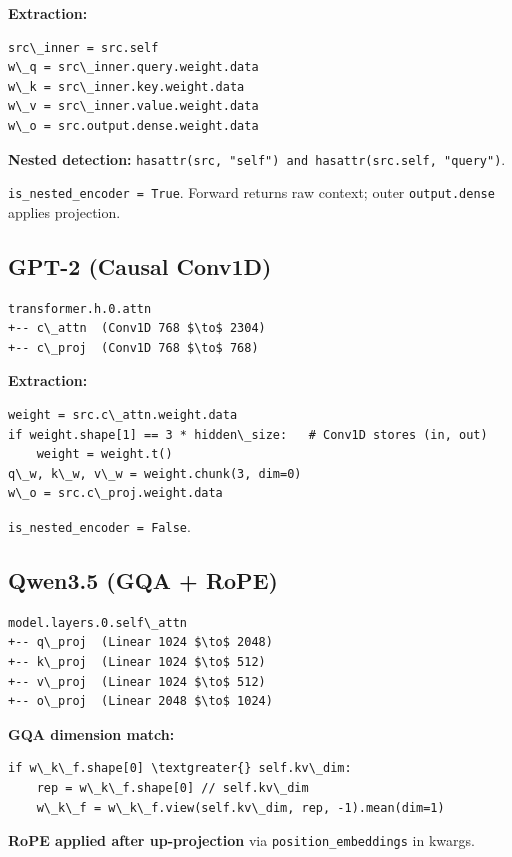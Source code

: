 \textbf{Extraction:}
\begin{lstlisting}
src\_inner = src.self
w\_q = src\_inner.query.weight.data
w\_k = src\_inner.key.weight.data
w\_v = src\_inner.value.weight.data
w\_o = src.output.dense.weight.data
\end{lstlisting}

\textbf{Nested detection:} \texttt{hasattr(src, "self") and hasattr(src.self, "query")}.

\texttt{is\_nested\_encoder = True}. Forward returns raw context; outer 
\texttt{output.dense} applies projection.

\subsection{GPT-2 (Causal Conv1D)}

\begin{lstlisting}
transformer.h.0.attn
+-- c\_attn  (Conv1D 768 $\to$ 2304)
+-- c\_proj  (Conv1D 768 $\to$ 768)
\end{lstlisting}

\textbf{Extraction:}
\begin{lstlisting}
weight = src.c\_attn.weight.data
if weight.shape[1] == 3 * hidden\_size:   # Conv1D stores (in, out)
    weight = weight.t()
q\_w, k\_w, v\_w = weight.chunk(3, dim=0)
w\_o = src.c\_proj.weight.data
\end{lstlisting}

\texttt{is\_nested\_encoder = False}.

\subsection{Qwen3.5 (GQA + RoPE)}

\begin{lstlisting}
model.layers.0.self\_attn
+-- q\_proj  (Linear 1024 $\to$ 2048)
+-- k\_proj  (Linear 1024 $\to$ 512)
+-- v\_proj  (Linear 1024 $\to$ 512)
+-- o\_proj  (Linear 2048 $\to$ 1024)
\end{lstlisting}

\textbf{GQA dimension match:}
\begin{lstlisting}
if w\_k\_f.shape[0] \textgreater{} self.kv\_dim:
    rep = w\_k\_f.shape[0] // self.kv\_dim
    w\_k\_f = w\_k\_f.view(self.kv\_dim, rep, -1).mean(dim=1)
\end{lstlisting}

\textbf{RoPE applied after up-projection} via \texttt{position\_embeddings} in kwargs.

